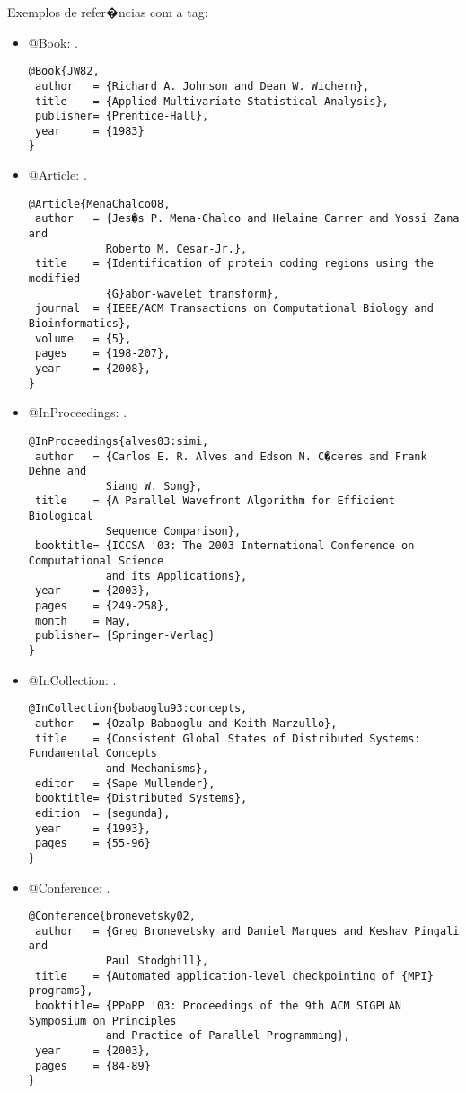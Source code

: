 Exemplos de refer�ncias com a tag:
\begin{itemize}
\item @Book: \citep{JW82}.
{\scriptsize\begin{verbatim}
@Book{JW82,
 author   = {Richard A. Johnson and Dean W. Wichern},
 title    = {Applied Multivariate Statistical Analysis},
 publisher= {Prentice-Hall},
 year     = {1983}
}
\end{verbatim}}

\item @Article: \citep{MenaChalco08}.
{\scriptsize\begin{verbatim}
@Article{MenaChalco08,
 author   = {Jes�s P. Mena-Chalco and Helaine Carrer and Yossi Zana and 
            Roberto M. Cesar-Jr.},
 title    = {Identification of protein coding regions using the modified 
            {G}abor-wavelet transform},
 journal  = {IEEE/ACM Transactions on Computational Biology and Bioinformatics},
 volume   = {5},
 pages    = {198-207},
 year     = {2008},
}
\end{verbatim}}

\item @InProceedings: \citep{alves03:simi}.
{\scriptsize\begin{verbatim}
@InProceedings{alves03:simi,
 author   = {Carlos E. R. Alves and Edson N. C�ceres and Frank Dehne and 
            Siang W. Song},
 title    = {A Parallel Wavefront Algorithm for Efficient Biological 
            Sequence Comparison},
 booktitle= {ICCSA '03: The 2003 International Conference on Computational Science
            and its Applications},
 year     = {2003},
 pages    = {249-258},
 month    = May,
 publisher= {Springer-Verlag}
}
\end{verbatim}}

\item @InCollection: \citep{bobaoglu93:concepts}.
{\scriptsize\begin{verbatim}
@InCollection{bobaoglu93:concepts,
 author   = {Ozalp Babaoglu and Keith Marzullo},
 title    = {Consistent Global States of Distributed Systems: Fundamental Concepts
            and Mechanisms},
 editor   = {Sape Mullender},
 booktitle= {Distributed Systems},
 edition  = {segunda},
 year     = {1993},
 pages    = {55-96}
}
\end{verbatim}}

\item @Conference: \citep{bronevetsky02}.
{\scriptsize\begin{verbatim}
@Conference{bronevetsky02,
 author   = {Greg Bronevetsky and Daniel Marques and Keshav Pingali and 
            Paul Stodghill},
 title    = {Automated application-level checkpointing of {MPI} programs},
 booktitle= {PPoPP '03: Proceedings of the 9th ACM SIGPLAN Symposium on Principles
            and Practice of Parallel Programming},
 year     = {2003},
 pages    = {84-89}
}
\end{verbatim}}


\end{itemize}

